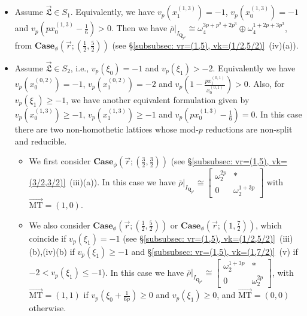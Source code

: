 \documentclass[11pt]{amsart}
\theoremstyle{definition}
\numberwithin{equation}{subsection}
\theoremstyle{plain}
\theoremstyle{plain}
\theoremstyle{plain}
\theoremstyle{plain}
\theoremstyle{plain}
\theoremstyle{plain}
\theoremstyle{plain}
\theoremstyle{plain}
\theoremstyle{plain}
\theoremstyle{plain}
\theoremstyle{plain}
\theoremstyle{plain}
\theoremstyle{definition}
\theoremstyle{definition}
\theoremstyle{definition}
\theoremstyle{remark}
\renewcommand{\(}{\textup{(}}
\renewcommand{\)}{\textup{)}}
\newcommand{\Q}{\mathbf{Q}}
\newcommand{\rhobar}{\overline{\rho}}
\newcommand{\fL}{\mathfrak{L}}
\newcommand{\vr}{\vec{r}}
\newcommand{\vL}{\vec{\fL}}
\newcommand{\IQptwo}{{I_{\Q_{p^2}}}}
\begin{document}
\begin{itemize}[leftmargin=*]
\item Assume $\vL\in S_1$. Equivalently, we have $v_p(x_1^{(1,3)})=-1$, $v_p(x_0^{(1,3)})=-1$ and $v_p(px_0^{(1,3)}-\frac{1}{6})>0$. Then we have $\rhobar|_\IQptwo\cong\omega_4^{3p+p^2+2p^3}\oplus\omega_4^{1+2p+3p^3}$, from $\mathbf{Case}_\phi(\vr;(\frac{1}{2},\frac{5}{2}))$ (see \S\ref{subsubsec: vr=(1,5), vk=(1/2,5/2)}~(iv)(a)).

\item Assume $\vL\in S_2$, i.e.,  $v_p(\xi_0)=-1$ and $v_p(\xi_1)>-2$. Equivalently we have $v_p(x_0^{(0,2)})=-1$, $v_p(x_1^{(0,2)})=-2$ and $v_p(1-\frac{px_1^{(0,1)}}{x_0^{(0,1)}})>0$. Also, for $v_p(\xi_1)\geq -1$, we have another equivalent formulation given by $v_p(x_0^{(1,3)})\geq -1$, $v_p(x_1^{(1,3)})\geq -1$ and $v_p(px_0^{(1,3)}-\frac{1}{6})=0$. In this case there are two non-homothetic lattices whose mod-$p$ reductions are non-split and reducible.
\begin{itemize}[leftmargin=*]
    \item We first consider $\mathbf{Case}_\phi(\vr;(\frac{3}{2},\frac{3}{2}))$ (see \S\ref{subsubsec: vr=(1,5), vk=(3/2,3/2)}~(iii)(a)). In this case we have $\rhobar|_\IQptwo\cong
    \begin{bmatrix}
        \omega_2^{2p} & * \\ 0 & \omega_2^{1+3p}
    \end{bmatrix}$ with $\vec{\mathrm{MT}}=(1,0)$.
    \item We also consider $\mathbf{Case}_\phi(\vr;(\frac{1}{2},\frac{5}{2}))$ or $\mathbf{Case}_\phi(\vr;(1,\frac{7}{2}))$, which coincide if $v_p(\xi_1)=-1$ (see \S\ref{subsubsec: vr=(1,5), vk=(1/2,5/2)}~(iii)(b),(iv)(b) if $v_p(\xi_1)\geq -1$ and \S\ref{subsubsec: vr=(1,5), vk=(1,7/2)}~(v)  if $-2<v_p(\xi_1)\leq -1$). In this case we have $\rhobar|_\IQptwo\cong
    \begin{bmatrix}
        \omega_2^{1+3p} & * \\ 0 & \omega_2^{2p}
    \end{bmatrix}$, with $\vec{\mathrm{MT}}=(1,1)$ if $v_p(\xi_0+\frac{1}{6p})\geq 0$ and $v_p(\xi_1)\geq 0$, and $\vec{\mathrm{MT}}=(0,0)$ otherwise.
\end{itemize}


\end{itemize}
\end{document}
